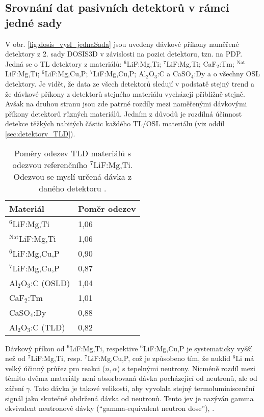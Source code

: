 \subsection{Srovnání dat pasivních detektorů v rámci jedné sady}
V obr. \ref{fig:dosis_vysl_jednaSada} jsou uvedeny dávkové příkony naměřené detektory z 2. sady DOSIS3D v závislosti na pozici detektoru, tzn. na PDP. Jedná se o TL detektory z materiálů: $^6$LiF:Mg,Ti; $^7$LiF:Mg,Ti; CaF$_2$:Tm; $^{\text{Nat}}$LiF:Mg,Ti; $^6$LiF:Mg,Cu,P; $^7$LiF:Mg,Cu,P; Al$_2$O$_3$:C a CaSO$_4$:Dy a o všechny OSL detektory. Je vidět, že data ze všech detektorů sledují v podstatě stejný trend a že dávkové příkony z detektorů stejného materiálu vycházejí přibližně stejně. Avšak na druhou stranu jsou zde patrné rozdíly mezi naměřenými dávkovými příkony detektorů různých materiálů. Jedním z důvodů je rozdílná účinnost detekce těžkých nabitých částic každého TL/OSL materiálu (viz oddíl \ref{sec:detektory_TLD}).
\begin{table}[H]
  \centering
  \def\arraystretch{0.8}
  \caption{Poměry odezev TLD materiálů s odezvou referenčního $^7$LiF:Mg,Ti. Odezvou se myslí určená dávka z daného detektoru \cite{dosis}.}
  \label{tab:dosis_TLD_ratio}
  \begin{tabular}{ll}
	\toprule
	Materiál & Poměr odezev\\
	\midrule
$^6$LiF:Mg,Ti		&1,06\\
$^{\text{Nat}}$LiF:Mg,Ti	&1,06\\
$^6$LiF:Mg,Cu,P		&0,90\\
$^7$LiF:Mg,Cu,P		&0,87\\
Al$_2$O$_3$:C (OSLD)&1,04\\ 
CaF$_2$:Tm			&1,01\\
CaSO$_4$:Dy			&0,88\\
Al$_2$O$_3$:C (TLD)	&0,82\\
\bottomrule
  \end{tabular}
\end{table}

Dávkový příkon od $^6$LiF:Mg,Ti, respektive $^6$LiF:Mg,Cu,P je systematicky vyšší než od $^7$LiF:Mg,Ti, resp. $^7$LiF:Mg,Cu,P, což je způsobeno tím, že nuklid $^6$Li má velký účinný průřez pro reakci ($n,\alpha$) s tepelnými neutrony. Nicméně rozdíl mezi těmito dvěma materiály není absorbovaná dávka pocházející od neutronů, ale od záření $\gamma$. Tato dávka je takové velikosti, aby vyvolala stejný termoluminiscenční signál jako skutečně obdržená dávka od neutronů. Tento jev je nazýván gamma ekvivalent neutronové dávky (``gamma-equivalent neutron dose''), \cite{dosis}.

